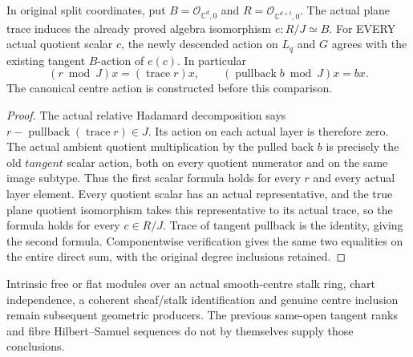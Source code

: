\begin{lemma}
\label{hir:relative-normal-actual-centre-trace-scalar-dictionary}
\leanok
In original split coordinates, put $B=\mathcal O_{\mathbb C^d,0}$ and
$R=\mathcal O_{\mathbb C^{d+t},0}$.  The actual plane trace induces the
already proved algebra isomorphism $e:R/J\simeq B$.  For EVERY actual
quotient scalar $c$, the newly descended action on $L_q$ and $G$ agrees
with the existing tangent $B$-action of $e(c)$.  In particular
\[
 (r\bmod J)x=(\operatorname{trace} r)x,
 \qquad
 (\operatorname{pullback} b\bmod J)x=bx.
\]
The canonical centre action is constructed before this comparison.
\end{lemma}
\begin{proof}
The actual relative Hadamard decomposition says
$r-\operatorname{pullback}(\operatorname{trace}r)\in J$.
Its action on each actual layer is therefore zero.  The actual ambient
quotient multiplication by the pulled back $b$ is precisely the old
$tangent$ scalar action, both on every quotient numerator and on the
same image subtype.  Thus the first scalar formula holds for every
$r$ and every actual layer element.  Every quotient scalar has an
actual representative, and the true plane quotient isomorphism takes
this representative to its actual trace, so the formula holds for every
$c\in R/J$.  Trace of tangent pullback is the identity, giving the second
formula.  Componentwise verification gives the same two equalities on
the entire direct sum, with the original degree inclusions retained.
\end{proof}

Intrinsic free or flat modules over an actual smooth-centre stalk ring,
chart independence, a coherent sheaf/stalk identification and genuine
centre inclusion remain subsequent geometric producers.  The previous
same-open tangent ranks and fibre Hilbert--Samuel sequences do not by
themselves supply those conclusions.
